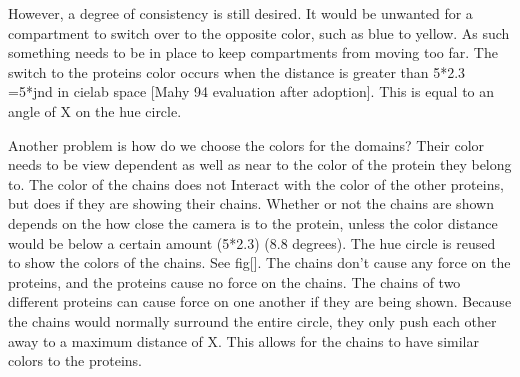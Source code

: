 \documentclass[review,journal]{vgtc}         %
\begin{document}
However, a degree of consistency is still desired. It would be unwanted for a compartment to switch over to the opposite color, such as blue to yellow.  
As such something needs to be in place to keep compartments from moving too far.
The switch to the proteins color occurs when the distance is greater than 5*2.3 =5*jnd in cielab space [Mahy 94 evaluation after adoption]. 
This is equal to an angle of X on the hue circle.

Another problem is how do we choose the colors for the domains? Their color needs to be view dependent as well as near to the color of the protein they belong to. 
The color of the chains does not Interact with the color of the other proteins, but does if they are showing their chains. 
Whether or not the chains are shown depends on the how close the camera is to the protein, unless the color distance would be below a certain amount (5*2.3) (8.8 degrees). 
The hue circle is reused to show the colors of the chains. See fig[]. 
The chains don’t cause any force on the proteins, and the proteins cause no force on the chains. 
The chains of two different proteins can cause force on one another if they are being shown. 
Because the chains would normally surround the entire circle, they only push each other away to a maximum distance of X. 
This allows for the chains to have similar colors to the proteins.
\end{document}
